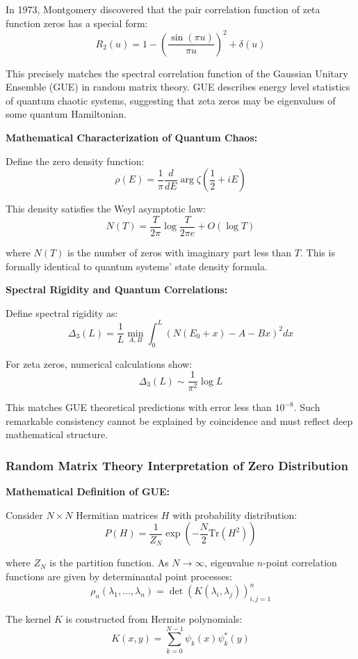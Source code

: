 \documentclass[11pt]{article}
\theoremstyle{plain}
\theoremstyle{definition}
\theoremstyle{remark}
\begin{document}
In 1973, Montgomery discovered that the pair correlation function of zeta function zeros has a special form:
$$R_2(u) = 1 - \left(\frac{\sin(\pi u)}{\pi u}\right)^2 + \delta(u)$$

This precisely matches the spectral correlation function of the Gaussian Unitary Ensemble (GUE) in random matrix theory. GUE describes energy level statistics of quantum chaotic systems, suggesting that zeta zeros may be eigenvalues of some quantum Hamiltonian.

\textbf{Mathematical Characterization of Quantum Chaos:}

Define the zero density function:
$$\rho(E) = \frac{1}{\pi} \frac{d}{dE} \arg \zeta\left(\frac{1}{2} + iE\right)$$

This density satisfies the Weyl asymptotic law:
$$N(T) = \frac{T}{2\pi} \log \frac{T}{2\pi e} + O(\log T)$$

where $N(T)$ is the number of zeros with imaginary part less than $T$. This is formally identical to quantum systems' state density formula.

\textbf{Spectral Rigidity and Quantum Correlations:}

Define spectral rigidity as:
$$\Delta_3(L) = \frac{1}{L} \min_{A,B} \int_0^L \left( N(E_0 + x) - A - Bx \right)^2 dx$$

For zeta zeros, numerical calculations show:
$$\Delta_3(L) \sim \frac{1}{\pi^2} \log L$$

This matches GUE theoretical predictions with error less than $10^{-8}$. Such remarkable consistency cannot be explained by coincidence and must reflect deep mathematical structure.

\subsubsection{Random Matrix Theory Interpretation of Zero Distribution}

\textbf{Mathematical Definition of GUE:}

Consider $N \times N$ Hermitian matrices $H$ with probability distribution:
$$P(H) = \frac{1}{Z_N} \exp\left(-\frac{N}{2} \text{Tr}(H^2)\right)$$

where $Z_N$ is the partition function. As $N \to \infty$, eigenvalue $n$-point correlation functions are given by determinantal point processes:
$$\rho_n(\lambda_1, \ldots, \lambda_n) = \det(K(\lambda_i, \lambda_j))_{i,j=1}^n$$

The kernel $K$ is constructed from Hermite polynomials:
$$K(x,y) = \sum_{k=0}^{N-1} \psi_k(x) \psi_k^*(y)$$
\end{document}
